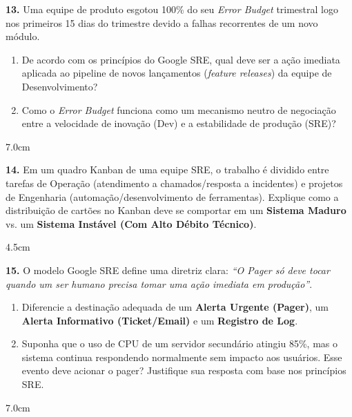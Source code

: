 \documentclass[12pt]{article}
\begin{document}
\vspace{0.4cm}

\textbf{13.} Uma equipe de produto esgotou 100\% do seu \textit{Error Budget} trimestral logo nos primeiros 15 dias do trimestre devido a falhas recorrentes de um novo módulo.
\begin{enumerate}[label=\alph*)]
    \item De acordo com os princípios do Google SRE, qual deve ser a ação imediata aplicada ao pipeline de novos lançamentos (\textit{feature releases}) da equipe de Desenvolvimento?
    \item Como o \textit{Error Budget} funciona como um mecanismo neutro de negociação entre a velocidade de inovação (Dev) e a estabilidade de produção (SRE)?
\end{enumerate}
\begin{resposta}{7.0cm}
\end{resposta}

\vspace{0.4cm}

\textbf{14.} Em um quadro Kanban de uma equipe SRE, o trabalho é dividido entre tarefas de Operação (atendimento a chamados/resposta a incidentes) e projetos de Engenharia (automação/desenvolvimento de ferramentas). Explique como a distribuição de cartões no Kanban deve se comportar em um \textbf{Sistema Maduro} vs. um \textbf{Sistema Instável (Com Alto Débito Técnico)}.
\begin{resposta}{4.5cm}
\end{resposta}

\vspace{0.4cm}

\textbf{15.} O modelo Google SRE define uma diretriz clara: \textit{``O Pager só deve tocar quando um ser humano precisa tomar uma ação imediata em produção''}.
\begin{enumerate}[label=\alph*)]
    \item Diferencie a destinação adequada de um \textbf{Alerta Urgente (Pager)}, um \textbf{Alerta Informativo (Ticket/Email)} e um \textbf{Registro de Log}.
    \item Suponha que o uso de CPU de um servidor secundário atingiu 85\%, mas o sistema continua respondendo normalmente sem impacto aos usuários. Esse evento deve acionar o pager? Justifique sua resposta com base nos princípios SRE.
\end{enumerate}
\begin{resposta}{7.0cm}
\end{resposta}
\end{document}
